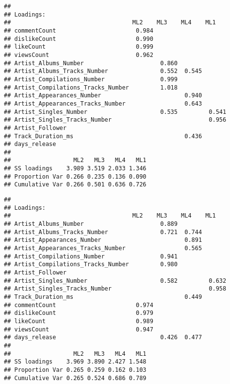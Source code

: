 \documentclass[
]{article}
\newenvironment{Shaded}{\begin{snugshade}}{\end{snugshade}}
\newcommand{\CommentTok}[1]{\textcolor[rgb]{0.56,0.35,0.01}{\textit{#1}}}
\newcommand{\DataTypeTok}[1]{\textcolor[rgb]{0.13,0.29,0.53}{#1}}
\newcommand{\FloatTok}[1]{\textcolor[rgb]{0.00,0.00,0.81}{#1}}
\newcommand{\KeywordTok}[1]{\textcolor[rgb]{0.13,0.29,0.53}{\textbf{#1}}}
\newcommand{\NormalTok}[1]{#1}
\newcommand{\OperatorTok}[1]{\textcolor[rgb]{0.81,0.36,0.00}{\textbf{#1}}}
\begin{document}
\begin{verbatim}
## 
## Loadings:
##                                   ML2    ML3    ML4    ML1   
## commentCount                       0.984                     
## dislikeCount                       0.990                     
## likeCount                          0.999                     
## viewsCount                         0.962                     
## Artist_Albums_Number                      0.860              
## Artist_Albums_Tracks_Number               0.552  0.545       
## Artist_Compilations_Number                0.999              
## Artist_Compilations_Tracks_Number         1.018              
## Artist_Appearances_Number                        0.940       
## Artist_Appearances_Tracks_Number                 0.643       
## Artist_Singles_Number                     0.535         0.541
## Artist_Singles_Tracks_Number                            0.956
## Artist_Follower                                              
## Track_Duration_ms                                0.436       
## days_release                                                 
## 
##                  ML2   ML3   ML4   ML1
## SS loadings    3.989 3.519 2.033 1.346
## Proportion Var 0.266 0.235 0.136 0.090
## Cumulative Var 0.266 0.501 0.636 0.726
\end{verbatim}

\begin{Shaded}
\end{Shaded}

\begin{verbatim}
## 
## Loadings:
##                                   ML2    ML3    ML4    ML1   
## Artist_Albums_Number                      0.889              
## Artist_Albums_Tracks_Number               0.721  0.744       
## Artist_Appearances_Number                        0.891       
## Artist_Appearances_Tracks_Number                 0.565       
## Artist_Compilations_Number                0.941              
## Artist_Compilations_Tracks_Number         0.980              
## Artist_Follower                                              
## Artist_Singles_Number                     0.582         0.632
## Artist_Singles_Tracks_Number                            0.958
## Track_Duration_ms                                0.449       
## commentCount                       0.974                     
## dislikeCount                       0.979                     
## likeCount                          0.989                     
## viewsCount                         0.947                     
## days_release                              0.426  0.477       
## 
##                  ML2   ML3   ML4   ML1
## SS loadings    3.969 3.890 2.427 1.548
## Proportion Var 0.265 0.259 0.162 0.103
## Cumulative Var 0.265 0.524 0.686 0.789
\end{verbatim}
\end{document}
